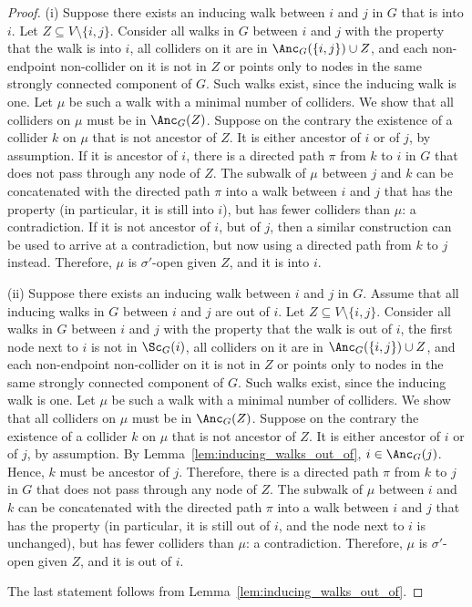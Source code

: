 \begin{proof}
  (i) Suppose there exists an inducing walk between $i$ and $j$ in $G$ that is into $i$.
  Let $Z \subseteq V\setminus\{i,j\}$. 
  Consider all walks in $G$ between $i$ and $j$ with the property that the walk is into $i$, all colliders on it are in $\Anc_{G}({\{i,j\}) \cup Z}$, and each non-endpoint non-collider on it is not in $Z$ or points only to nodes in the same strongly connected component of $G$.
  Such walks exist, since the inducing walk is one. 
  Let $\mu$ be such a walk with a minimal number of colliders.
  We show that all colliders on $\mu$ must be in $\Anc_{G}(Z)$. 
  Suppose on the contrary the existence of a collider $k$ on $\mu$ that is not ancestor of $Z$. 
  It is either ancestor of $i$ or of $j$, by assumption.
  If it is ancestor of $i$, there is a directed path $\pi$ from $k$ to $i$ in $G$ that does not pass through any node of $Z$.
  The subwalk of $\mu$ between $j$ and $k$ can be concatenated with the directed path $\pi$ into a walk between $i$ and $j$ that has the property (in particular, it is still into $i$), but has fewer colliders than $\mu$: a contradiction.
  If it is not ancestor of $i$, but of $j$, then a similar construction can be used to arrive at a contradiction, but now using a directed path from $k$ to $j$ instead.
  Therefore, $\mu$ is $\sigma'$-open given $Z$, and it is into $i$.

  (ii) Suppose there exists an inducing walk between $i$ and $j$ in $G$.
  Assume that all inducing walks in $G$ between $i$ and $j$ are out of $i$.
  Let $Z \subseteq V\setminus\{i,j\}$. 
  Consider all walks in $G$ between $i$ and $j$ with the property that the walk is out of $i$, the first node next to $i$ is not in $\Sc_G(i)$, all colliders on it are in $\Anc_{G}({\{i,j\}) \cup Z}$, and each non-endpoint non-collider on it is not in $Z$ or points only to nodes in the same strongly connected component of $G$. 
  Such walks exist, since the inducing walk is one. 
  Let $\mu$ be such a walk with a minimal number of colliders.
  We show that all colliders on $\mu$ must be in $\Anc_{G}(Z)$. 
  Suppose on the contrary the existence of a collider $k$ on $\mu$ that is not ancestor of $Z$. 
  It is either ancestor of $i$ or of $j$, by assumption.
  By Lemma~\ref{lem:inducing_walks_out_of}, $i \in \Anc_G(j)$.
  Hence, $k$ must be ancestor of $j$.
  Therefore, there is a directed path $\pi$ from $k$ to $j$ in $G$ that does not pass through any node of $Z$.
  The subwalk of $\mu$ between $i$ and $k$ can be concatenated with the directed path $\pi$ into a walk between $i$ and $j$ that has the property (in particular, it is still out of $i$, and the node next to $i$ is unchanged), but has fewer colliders than $\mu$: a contradiction.
  Therefore, $\mu$ is $\sigma'$-open given $Z$, and it is out of $i$.

  The last statement follows from Lemma~\ref{lem:inducing_walks_out_of}.
\end{proof}

